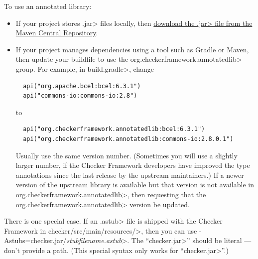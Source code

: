 To use an annotated library:

\begin{itemize}
\item
If your project stores \<.jar> files locally, then
\href{https://central.sonatype.com/search?q=org.checkerframework.annotatedlib}{download
  the \<.jar> file from the Maven Central Repository}.

\item
If your project manages dependencies using a tool such as Gradle or Maven,
then update your buildfile to use the \<org.checkerframework.annotatedlib>
group.  For example, in \<build.gradle>, change

\begin{Verbatim}
  api("org.apache.bcel:bcel:6.3.1")
  api("commons-io:commons-io:2.8")
\end{Verbatim}

\noindent
to

\begin{Verbatim}
  api("org.checkerframework.annotatedlib:bcel:6.3.1")
  api("org.checkerframework.annotatedlib:commons-io:2.8.0.1")
\end{Verbatim}

\noindent
Usually use the same version number.  (Sometimes you will use a slightly larger
number, if the Checker Framework developers have improved the type
annotations since the last release by the upstream maintainers.)  If a
newer version of the upstream library is available but that version is not
available in \<org.checkerframework.annotatedlib>, then
 requesting that the
\<org.checkerframework.annotatedlib> version be updated.
\end{itemize}


There is one special case.  If an \<.astub> file is shipped with the
Checker Framework in \<checker/src/main/resources/>, then you can
use \<-Astubs=checker.jar/\emph{stubfilename.astub}>.
The ``\<checker.jar>'' should be literal --- don't provide a path.
(This special syntax only works for ``\<checker.jar>''.)



